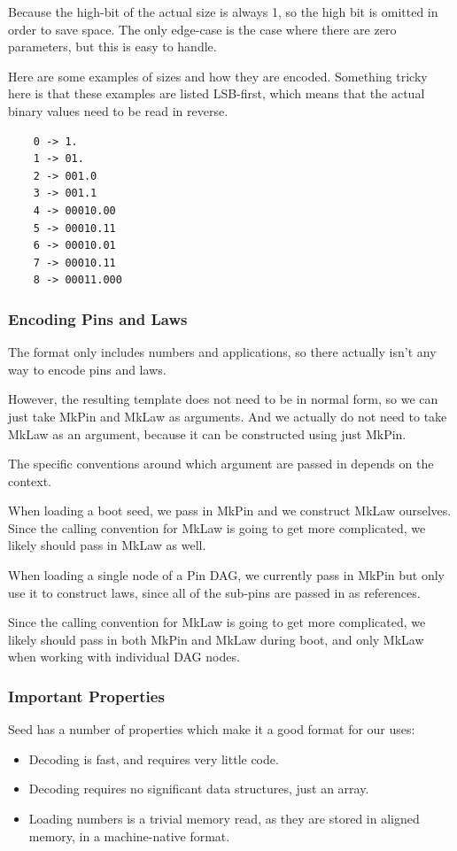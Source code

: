 Because the high-bit of the actual size is always 1, so the high bit is
omitted in order to save space.  The only edge-case is the case where
there are zero parameters, but this is easy to handle.

Here are some examples of sizes and how they are encoded.  Something
tricky here is that these examples are listed LSB-first, which means
that the actual binary values need to be read in reverse.

\begin{verbatim}
    0 -> 1.
    1 -> 01.
    2 -> 001.0
    3 -> 001.1
    4 -> 00010.00
    5 -> 00010.11
    6 -> 00010.01
    7 -> 00010.11
    8 -> 00011.000
\end{verbatim}

\subsubsection{Encoding Pins and Laws}

The format only includes numbers and applications, so there actually
isn't any way to encode pins and laws.

However, the resulting template does not need to be in normal form, so
we can just take MkPin and MkLaw as arguments.  And we actually do not
need to take MkLaw as an argument, because it can be constructed using
just MkPin.

The specific conventions around which argument are passed in depends on
the context.

When loading a boot seed, we pass in MkPin and we construct MkLaw
ourselves.  Since the calling convention for MkLaw is going to get more
complicated, we likely should pass in MkLaw as well.

When loading a single node of a Pin DAG, we currently pass in MkPin but
only use it to construct laws, since all of the sub-pins are passed in
as references.

Since the calling convention for MkLaw is going to get more complicated,
we likely should pass in both MkPin and MkLaw during boot, and only
MkLaw when working with individual DAG nodes.


\subsubsection{Important Properties}

Seed has a number of properties which make it a good format for our uses:

\begin{itemize}
\item Decoding is fast, and requires very little code.
\item Decoding requires no significant data structures, just an array.
\item Loading numbers is a trivial memory read, as they are stored in
      aligned memory, in a machine-native format.
\end{itemize}

